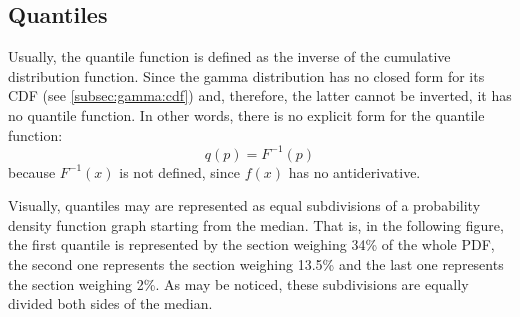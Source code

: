 \documentclass[12pt]{article}
\begin{document}
\pagebreak
\subsection{Quantiles}
Usually, the quantile function is defined as the inverse of the cumulative distribution function. Since the gamma
distribution has no closed form for its CDF (see \autoref{subsec:gamma:cdf}) and, therefore, the latter cannot be
inverted, it has no quantile function. In other words, there is no explicit form for the quantile function:
\begin{equation}
	q(p)=F^{-1}(p)
\end{equation}
because $F^{-1}(x)$ is not defined, since $f(x)$ has no antiderivative.

Visually, quantiles may are represented as equal subdivisions of a probability density function graph starting from the
median. That is, in the following figure, the first quantile is represented by the section weighing 34\% of the whole
PDF, the second one represents the section weighing 13.5\% and the last one represents the section weighing 2\%. As may
be noticed, these subdivisions are equally divided both sides of the median.



\pagebreak
\end{document}
